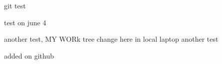 git test

test on june 4

another test, MY WORk tree change here in local laptop
another test

added on github